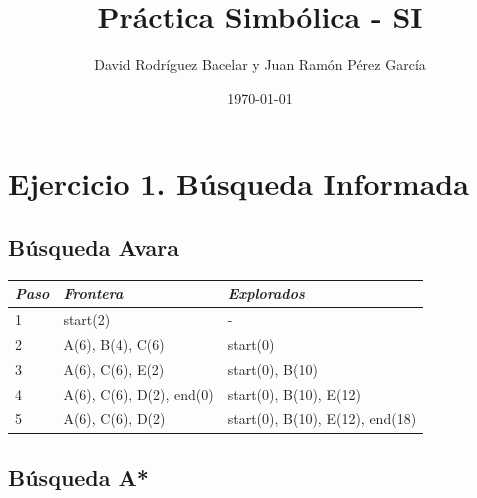 \documentclass{article}
\title{Práctica Simbólica -  SI}
\author{David Rodríguez Bacelar y Juan Ramón Pérez García}
\date{\today}
\begin{document}
\maketitle

\section{Ejercicio 1. Búsqueda Informada}

\bigskip\bigskip

\subsection{Búsqueda Avara}

\bigskip

\resizebox{\textwidth}{!} {
    \begin{tabular}{l|l|l}
        \hline
        \textit{Paso} & \textit{Frontera}                  & \textit{Explorados}             \\ \hline
        1             & start(2)                         & -                               \\ \hline
        2             & A(6), B(4), C(6)            & start(0)                        \\ \hline
        3             & A(6), C(6), E(2)            & start(0), B(10)                 \\ \hline
        4             & A(6), C(6), D(2), end(0) & start(0), B(10), E(12)          \\ \hline
        5             & A(6), C(6), D(2)            & start(0), B(10), E(12), end(18) \\ \hline
    \end{tabular}
}

\bigskip\bigskip
\subsection{Búsqueda A*}

\bigskip
\end{document}
